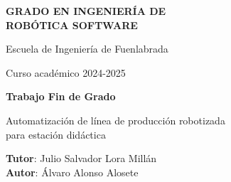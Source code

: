 \thispagestyle{empty}
\vspace{2cm}

\begin{figure}[htb]
  \centerline{}
\end{figure}

\begin{center}
  {\Large {\bf GRADO EN INGENIERÍA DE\\ 
                ROBÓTICA SOFTWARE}}
  \vspace{5mm}
 
  {\large {Escuela de Ingeniería de Fuenlabrada}}
  \vspace{5mm}

  {\large {Curso académico 2024-2025}}

  \vspace{1cm}

  {\large {\bf Trabajo Fin de Grado}}

  \vspace{2cm}

  {\Large {Automatización de línea de producción robotizada  \\
              para estación didáctica\\[1cm] }}

  \vspace{4cm}
  {\bf Tutor}: Julio Salvador Lora Millán \\
  {\bf Autor}: Álvaro Alonso Alosete
\end{center}

\clearpage
\thispagestyle{empty}
